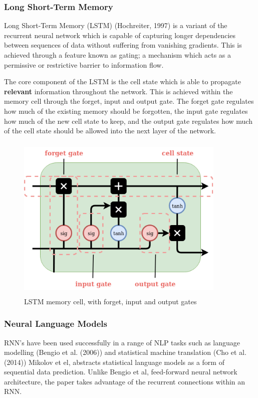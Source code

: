 \subsubsection{Long Short-Term Memory}
Long Short-Term Memory (LSTM) (Hochreiter, 1997) is a variant of the recurrent neural network which is capable of capturing longer dependencies between sequences of data without suffering from vanishing gradients. This is achieved through a feature known as gating; a mechanism which acts as a permissive or restrictive barrier to information flow. 

\noindent
\newline
The core component of the LSTM is the cell state which is able to propagate \textbf{relevant} information throughout the network. This is achieved within the memory cell through the forget, input and output gate. The forget gate regulates how much of the existing memory should be forgotten, the input gate regulates how much of the new cell state to keep, and the output gate regulates how much of the cell state should be allowed into the next layer of the network.

\begin{figure}[h]
	\includegraphics[width=10cm, height=8cm]{./figures/fig4}
	\centering
	\caption{LSTM memory cell, with forget, input and output gates}
	\label{fig:fig3}
\end{figure}

\subsubsection{Neural Language Models}
RNN's have been used successfully in a range of NLP tasks such as language modelling (Bengio et al. (2006)) and statistical machine translation (Cho et al. (2014)) Mikolov et el, abstracts statistical language models as a form of sequential data prediction. Unlike Bengio et al, feed-forward neural network architecture, the paper takes advantage of the recurrent connections within an RNN. 

